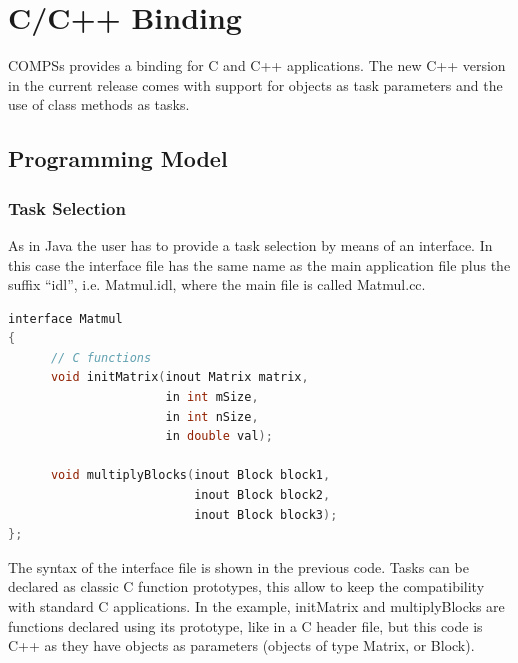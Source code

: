 \section{C/C++ Binding}
\label{sec:C}

COMPSs provides a binding for C and C++ applications. The new C++ version in the current release 
comes with support for objects as task parameters and the use of class methods as tasks.

\subsection{Programming Model}

\subsubsection{Task Selection}
As in Java the user has to provide a task selection by means of an interface. In this case 
the interface file has the same name as the main application file plus the suffix ``idl'', 
i.e. Matmul.idl, where the main file is called Matmul.cc.

\begin{lstlisting}[language=C++]
interface Matmul
{
      // C functions
      void initMatrix(inout Matrix matrix,
                      in int mSize,
                      in int nSize,
                      in double val);
                      
      void multiplyBlocks(inout Block block1,
                          inout Block block2,
                          inout Block block3);
};
\end{lstlisting}
%                           

The syntax of the interface file is shown in the previous code. Tasks can be declared as classic 
C function prototypes, this allow to keep the compatibility with standard C applications. 
In the example, initMatrix and multiplyBlocks are functions declared using its prototype, 
like in a C header file, but this code is C++ as they have objects as parameters (objects of 
type Matrix, or Block).


